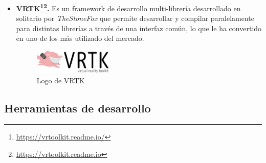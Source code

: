 \begin{itemize}
    \item \textbf{VRTK\footnote{\url{https://vrtoolkit.readme.io/}}\footnote{\url{https://vrtoolkit.readme.io}}.} Es un framework de desarrollo multi-librería desarrollado en solitario por \textit{TheStoneFox} que permite desarrollar y compilar paralelamente para distintas librerías a través de una interfaz común, lo que le ha convertido en uno de los más utilizado del mercado.
    
\begin{figure}[!h]
\begin{center}
\includegraphics[width=0.35\textwidth]{imagenes/4/vrtk-logo.jpg}
\caption{Logo de VRTK}
\label{fig:vrtk-logo}
\end{center}
\end{figure}

\end{itemize}

\subsection{Herramientas de desarrollo}

